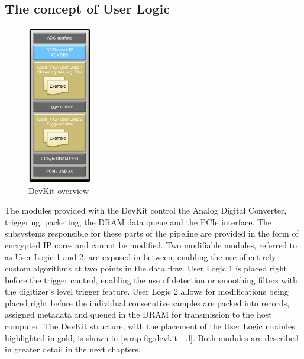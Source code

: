 \documentclass[12pt]{article}
\begin{document}
	\subsection{The concept of User Logic}
		\begin{figure}
			\includegraphics[width=0.25\textwidth]{img/devkit_ul.png}
			\caption{DevKit overview}\label{wrap-fig:devkit_ul}
		\end{figure}
		The modules provided with the DevKit control the Analog Digital Converter, triggering,
		packeting, the DRAM data queue and the PCIe interface. The subsystems responsible for these
		parts of the pipeline are provided in the form of encrypted IP cores and cannot be modified.
		Two modifiable modules, referred to as User Logic 1 and 2, are exposed in between,
		enabling the use of entirely custom algorithms at two points in the data flow.
		User Logic 1 is placed right before the trigger control, enabling the use of
		detection or smoothing filters with the digitizer's level trigger feature.
		User Logic 2 allows for modifications being placed right before the individual consecutive
		samples are packed into records, assigned metadata and queued in the DRAM for transmission to the
		host computer. The DevKit structure, with the placement of the User Logic modules highlighted in gold,
		is shown in \autoref{wrap-fig:devkit_ul}. 
		Both modules are described in greater detail in the next chapters.
		\par
		\newpage
\end{document}
